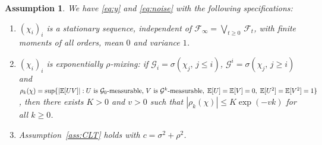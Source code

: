 \documentclass[ecta,nameyear,draft]{econsocart}
\makeatletter
\newtheorem{Assumption}{Assumption}
\newtheorem{rem}{Remark}
\renewcommand{\theAssumption}{\Alph{Assumption}}
\newcommand{\settheoremtag}[1]{%
	\let\oldtheAssumption\theAssumption%
	\renewcommand{\theAssumption}{#1}%
	\g@addto@macro\endAssumption{%
		\global\let\theAssumption\oldtheAssumption}%
}
\newcommand{\1}{\mathbf 1}
\def\E{\mathbb{E}}
\newcommand{\calF}{\mathcal{F}}
\newcommand{\calG}{\mathcal{G}}
\numberwithin{equation}{section}
\newcommand{\si}{{\sigma}}
\makeatother
\begin{document}
\begin{appendix}

%


\settheoremtag{$\boldsymbol{\chi}$}
\begin{Assumption}
	\label{ass:chi}
	We have \eqref{eq:y} and   \eqref{eq:noise} with the following specifications:
	\begin{enumerate}
		\item[(i)] $(\chi_i)_i$ is a stationary   sequence, independent of $\calF_\infty =  \bigvee_{t \geq 0} \, \calF_t$, with finite moments of all orders, mean $0$ and   variance $1$.
		\item[(ii)] $(\chi_i)_{i}$ is  exponentially $\rho$-mixing: if $\calG_i = \sigma(\chi_j, \, j \leq i)$, $\calG^i = \sigma(\chi_j, \, j \geq i)$  and 
$
			\rho_k(\chi) =   \sup \{ |\E[UV]|: \text{$U$ is $ \calG_0$-measurable, $V$ is $ \calG^k$-measurable}, \;
			\E[U] = \E[V] = 0, \; \E[U^2] = \E[V^2] = 1 \}$, then there exists $K > 0$ and $v > 0$ such that $|\rho_k(\chi)| \leq K \exp(-vk)$ for all $k \geq 0$.
		\item[(iii)] Assumption~\ref{ass:CLT} holds with $c=\si^2 +\rho^2$.
	\end{enumerate}
\end{Assumption}


\end{appendix}
\end{document}
